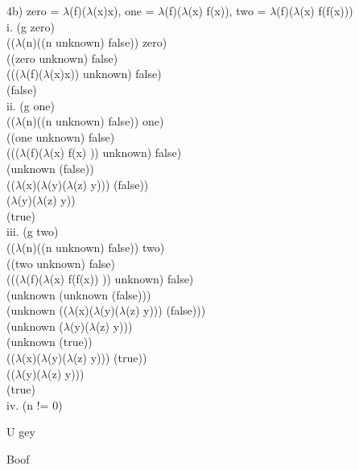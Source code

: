\documentclass[12pt]{article}
\begin{document}
\noindent 4b) zero = $\lambda$(f)($\lambda$(x)x), one = $\lambda$(f)($\lambda$(x) f(x)), two = $\lambda$(f)($\lambda$(x) f(f(x)))\\
i. (g zero)\\
(($\lambda$(n)((n unknown) false)) zero)\\
((zero unknown) false)\\
((($\lambda$(f)($\lambda$(x)x)) unknown) false)\\
(false)\\

\noindent ii. (g one)\\
(($\lambda$(n)((n unknown) false)) one)\\
((one unknown) false)\\
((($\lambda$(f)($\lambda$(x) f(x) )) unknown) false)\\
(unknown (false))\\
(($\lambda$(x)($\lambda$(y)($\lambda$(z) y))) (false))\\
($\lambda$(y)($\lambda$(z) y))\\
(true)\\

\noindent iii. (g two)\\
(($\lambda$(n)((n unknown) false)) two)\\
((two unknown) false)\\
((($\lambda$(f)($\lambda$(x) f(f(x)) )) unknown) false)\\
(unknown (unknown (false)))\\
(unknown (($\lambda$(x)($\lambda$(y)($\lambda$(z) y))) (false)))\\
(unknown ($\lambda$(y)($\lambda$(z) y)))\\
(unknown (true))\\
(($\lambda$(x)($\lambda$(y)($\lambda$(z) y))) (true))\\
(($\lambda$(y)($\lambda$(z) y)))\\
(true)\\

iv. (n != 0)
\pagebreak 

\begin{algorithm}[H]
\caption{U gey}
\begin{algorithmic}
\State Boof
\end{algorithmic}
\end{algorithm}
\end{document}
